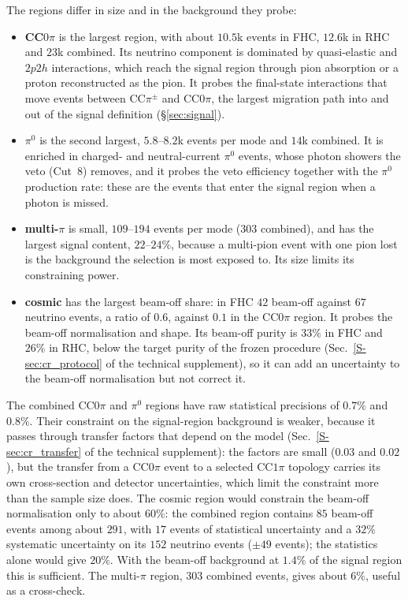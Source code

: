 \documentclass[11pt,a4paper]{article}
\newcommand{\suppref}[2]{#1~\ref{S-#2} of the technical supplement}
\begin{document}
The regions differ in size and in the background they probe:
\begin{itemize}
  \item \textbf{CC$0\pi$} is the largest region, with about $10.5$k events in FHC, $12.6$k in RHC and
    $23$k combined. Its neutrino component is dominated by quasi-elastic and $2p2h$ interactions,
    which reach the signal region through pion absorption or a proton reconstructed as the pion. It
    probes the final-state interactions that move events between CC$\pi^{\pm}$ and CC$0\pi$, the
    largest migration path into and out of the signal definition (\S\ref{sec:signal}).
  \item \textbf{$\pi^0$} is the second largest, $5.8$--$8.2$k events per mode and $14$k combined. It is
    enriched in charged- and neutral-current $\pi^0$ events, whose photon showers the veto (Cut~8)
    removes, and it probes the veto efficiency together with the $\pi^0$ production rate: these are
    the events that enter the signal region when a photon is missed.
  \item \textbf{multi-$\pi$} is small, $109$--$194$ events per mode ($303$ combined), and has the
    largest signal content, $22$--$24\%$, because a multi-pion event with one pion lost is the
    background the selection is most exposed to. Its size limits its constraining power.
  \item \textbf{cosmic} has the largest beam-off share: in FHC $42$ beam-off against $67$ neutrino
    events, a ratio of $0.6$, against $0.1$ in the CC$0\pi$ region. It probes the beam-off
    normalisation and shape. Its beam-off purity is $33\%$ in FHC and $26\%$ in RHC, below the
    target purity of the frozen procedure (\suppref{Sec.}{sec:cr_protocol}), so it can add an
    uncertainty to the beam-off normalisation but not correct it.
\end{itemize}

The combined CC$0\pi$ and $\pi^0$ regions have raw statistical precisions of $0.7\%$ and $0.8\%$.
Their constraint on the signal-region background is weaker, because it passes through transfer
factors that depend on the model (\suppref{Sec.}{sec:cr_transfer}): the factors are small ($0.03$
and $0.02$), but the transfer from a CC$0\pi$ event to a selected CC$1\pi$ topology carries its own
cross-section and detector uncertainties, which limit the constraint more than the sample size
does. The cosmic region would constrain the beam-off normalisation only to about $60\%$: the
combined region contains $85$ beam-off events among about $291$, with $17$ events of statistical
uncertainty and a $32\%$ systematic uncertainty on its $152$ neutrino events ($\pm49$ events); the
statistics alone would give $20\%$. With the beam-off background at $1.4\%$ of the signal region this
is sufficient. The multi-$\pi$ region, $303$ combined events, gives about $6\%$, useful as a
cross-check.
\end{document}
